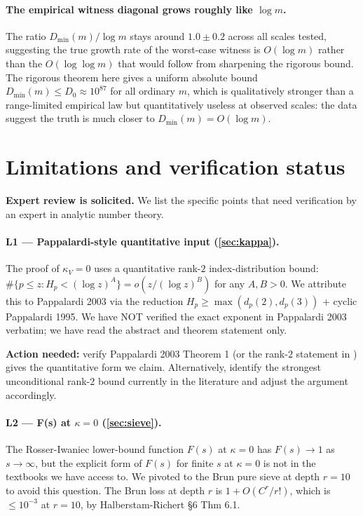 \documentclass[11pt,a4paper]{article}
\theoremstyle{plain}
\theoremstyle{definition}
\theoremstyle{remark}
\begin{document}
\paragraph{The empirical witness diagonal grows roughly like $\log m$.}
The ratio $D_{\min}(m) / \log m$ stays around $1.0 \pm 0.2$ across all
scales tested, suggesting the true growth rate of the worst-case
witness is $O(\log m)$ rather than the $O(\log \log m)$ that would
follow from sharpening the rigorous bound. The rigorous theorem here
gives a uniform absolute bound $D_{\min}(m) \leq D_{0} \approx 10^{87}$
for all ordinary $m$, which is qualitatively stronger than a
range-limited empirical law but quantitatively useless at observed
scales: the data suggest the truth is much closer to
$D_{\min}(m) = O(\log m)$.


\section{Limitations and verification status}\label{sec:limitations}

\textbf{Expert review is solicited.} We list the specific points that
need verification by an expert in analytic number theory.

\paragraph{L1 --- Pappalardi-style quantitative input
(\cref{sec:kappa}).}
The proof of $\kappa_{V} = 0$ uses a quantitative rank-$2$
index-distribution bound: $\#\{p \leq z : H_{p} < (\log z)^{A}\} =
o(z / (\log z)^{B})$ for any $A, B > 0$. We attribute this to
Pappalardi 2003 via the reduction $H_{p} \geq \max(d_{p}(2),
d_{p}(3))$ + cyclic Pappalardi 1995. We have NOT verified the exact
exponent in Pappalardi 2003 verbatim; we have read the abstract and
theorem statement only.

\textbf{Action needed:} verify Pappalardi 2003 Theorem 1 (or the
rank-$2$ statement in \cite{PappalardiSusa2010}) gives the quantitative
form we claim. Alternatively, identify the strongest unconditional
rank-$2$ bound currently in the literature and adjust the argument
accordingly.

\paragraph{L2 --- F(s) at $\kappa = 0$ (\cref{sec:sieve}).}
The Rosser-Iwaniec lower-bound function $F(s)$ at $\kappa = 0$ has
$F(s) \to 1$ as $s \to \infty$, but the explicit form of $F(s)$ for
finite $s$ at $\kappa = 0$ is not in the textbooks we have access to.
We pivoted to the Brun pure sieve at depth $r = 10$ to avoid this
question. The Brun loss at depth $r$ is $1 + O(C^{r}/r!)$, which is
$\leq 10^{-3}$ at $r = 10$, by Halberstam-Richert \S6 Thm 6.1.
\end{document}
